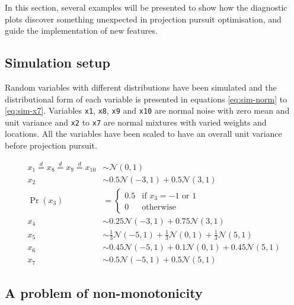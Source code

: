 In this section, several examples will be presented to show how the
diagnostic plots discover something unexpected in projection pursuit
optimisation, and guide the implementation of new features.

\hypertarget{simulation-setup}{%
\subsection{Simulation setup}\label{simulation-setup}}

Random variables with different distributions have been simulated and
the distributional form of each variable is presented in equations
\ref{eq:sim-norm} to \ref{eq:sim-x7}. Variables \texttt{x1},
\texttt{x8}, \texttt{x9} and \texttt{x10} are normal noise with zero
mean and unit variance and \texttt{x2} to \texttt{x7} are normal
mixtures with varied weights and locations. All the variables have been
scaled to have an overall unit variance before projection pursuit.

\begin{align}
x_1 \overset{d}{=} x_8 \overset{d}{=} x_9 \overset{d}{=} x_{10}& \sim \mathcal{N}(0, 1) \label{eq:sim-norm} \\
x_2 &\sim 0.5 \mathcal{N}(-3, 1) + 0.5 \mathcal{N}(3, 1)\label{eq:sim-x2}\\
\Pr(x_3) &= 
\begin{cases}
0.5 & \text{if $x_3 = -1$ or $1$}\\
0 & \text{otherwise}
\end{cases}\label{eq:sim-x3}\\
x_4 &\sim 0.25 \mathcal{N}(-3, 1) + 0.75 \mathcal{N}(3, 1) \label{eq:sim-x4}\\
x_5 &\sim \frac{1}{3} \mathcal{N}(-5, 1) + \frac{1}{3} \mathcal{N}(0, 1) + \frac{1}{3} \mathcal{N}(5, 1)\label{eq:sim-x5}\\
x_6 &\sim 0.45 \mathcal{N}(-5, 1) + 0.1 \mathcal{N}(0, 1) + 0.45 \mathcal{N}(5, 1)\label{eq:sim-x6}\\
x_7 &\sim 0.5 \mathcal{N}(-5, 1) + 0.5 \mathcal{N}(5, 1) 
\label{eq:sim-x7}
\end{align}

\hypertarget{monotonic}{%
\subsection{A problem of non-monotonicity}\label{monotonic}}

